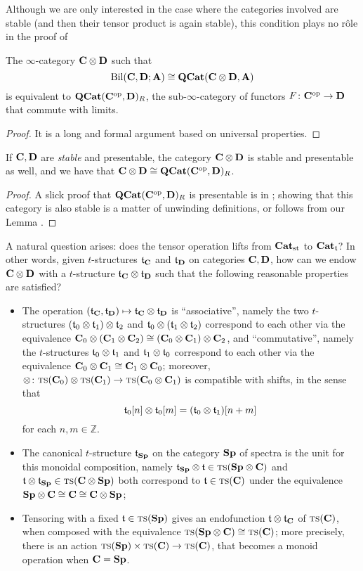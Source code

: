 Although we are only interested in the case where the categories involved are stable (and then their tensor product is again stable), this condition plays no r\^ole in the proof of
\begin{lemma}\label{tensor.is.repre}
The $\infty$\hyp{}category $\CC\otimes \D$ such that
\[
\text{Bil}(\CC,\D;\A)\cong \QCat(\CC\otimes\D, \A)
\]
is equivalent to $\QCat(\CC^\text{op},\D)_R$, the sub\hyp{}$\infty$\hyp{}category of functors $F\colon \CC^\text{op}\to \D$ that commute with limits. 
\end{lemma}
\begin{proof}
It is a long and formal argument based on universal properties.
\end{proof}
\begin{proposition}
If $\CC,\D$ are \emph{stable} and presentable, the category $\CC\otimes \D$ is stable and presentable as well, and we have that $\CC\otimes \D \cong \QCat(\CC^\text{op},\D)_R$.
\end{proposition}
\begin{proof}
A slick proof that $\QCat(\CC^\text{op},\D)_R$ is presentable is in \cite[p\@. 68]{Gro}; showing that this category is also stable is a matter of unwinding definitions, or follows from our Lemma . 
\end{proof}
A natural question arises: does the tensor operation lifts from $\Cat_\text{st}$ to $\Cat_\tee$? In other words, given $t$\hyp{}structures $\tee_\CC$ and $\tee_\D$ on categories $\CC,\D$, how can we endow $\CC\otimes \D$ with a $t$\hyp{}structure $\tee_\CC \otimes \tee_\D$ such that the following reasonable properties are satisfied?
\begin{itemize}
\item The operation $(\tee_\CC, \tee_\D)\mapsto \tee_\CC \otimes \tee_\D$ is ``associative'', namely the two $t$\hyp{}structures $(\tee_0\otimes \tee_1)\otimes \tee_2$ and $\tee_0 \otimes (\tee_1\otimes \tee_2)$ correspond to each other via the equivalence $\CC_0\otimes (\CC_1\otimes \CC_2)\cong (\CC_0\otimes \CC_1)\otimes \CC_2$, and ``commutative'', namely the $t$\hyp{}structures $\tee_0\otimes \tee_1$ and $\tee_1\otimes \tee_0$ correspond to each other via the equivalence $\CC_0\otimes \CC_1\cong \CC_1\otimes \CC_0$; moreover, $\otimes \colon \ts(\CC_0)\otimes \ts(\CC_1) \to \ts(\CC_0\otimes \CC_1)$ is compatible with shifts, in the sense that
\[
\tee_0[n]\otimes \tee_0[m] = (\tee_0 \otimes \tee_1)[n+m]
\]
for each $n,m\in\mathbb{Z}$.
\item The canonical $t$\hyp{}structure $\tee_\sp$ on the category $\sp$ of spectra is the unit for this monoidal composition, namely $\tee_\sp\otimes \tee\in \ts(\sp\otimes \CC)$ and $\tee\otimes \tee_\sp\in\ts(\CC\otimes \sp)$ both correspond to $\tee \in\ts(\CC)$ under the equivalence $\sp\otimes \CC \cong \CC \cong \CC \otimes \sp$;
\item Tensoring with a fixed $\tee\in\ts(\sp)$ gives an endofunction $\tee\otimes \tee_\CC$ of $\ts(\CC)$, when composed with the equivalence $\ts(\sp\otimes \CC)\cong \ts(\CC)$; more precisely, there is an action $\ts(\sp) \times \ts(\CC) \to \ts(\CC)$, that becomes a monoid operation when $\CC =\sp$.
\end{itemize}
